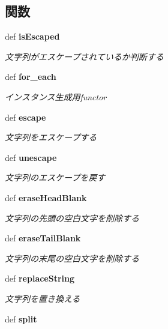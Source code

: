 \subsection*{関数}
\begin{CompactItemize}
\item 
def {\bf isEscaped}
\begin{CompactList}\small\item\em 文字列がエスケープされているか判断する \item\end{CompactList}\item 
def {\bf for\_\-each}\label{namespacesource__py_1_1_string_util_9d167ce259f6f6200324bfcb1878fce4}

\begin{CompactList}\small\item\em インスタンス生成用functor \item\end{CompactList}\item 
def {\bf escape}
\begin{CompactList}\small\item\em 文字列をエスケープする \item\end{CompactList}\item 
def {\bf unescape}
\begin{CompactList}\small\item\em 文字列のエスケープを戻す \item\end{CompactList}\item 
def {\bf eraseHeadBlank}
\begin{CompactList}\small\item\em 文字列の先頭の空白文字を削除する \item\end{CompactList}\item 
def {\bf eraseTailBlank}
\begin{CompactList}\small\item\em 文字列の末尾の空白文字を削除する \item\end{CompactList}\item 
def {\bf replaceString}
\begin{CompactList}\small\item\em 文字列を置き換える \item\end{CompactList}\item 
def {\bf split}

\end{CompactItemize}

